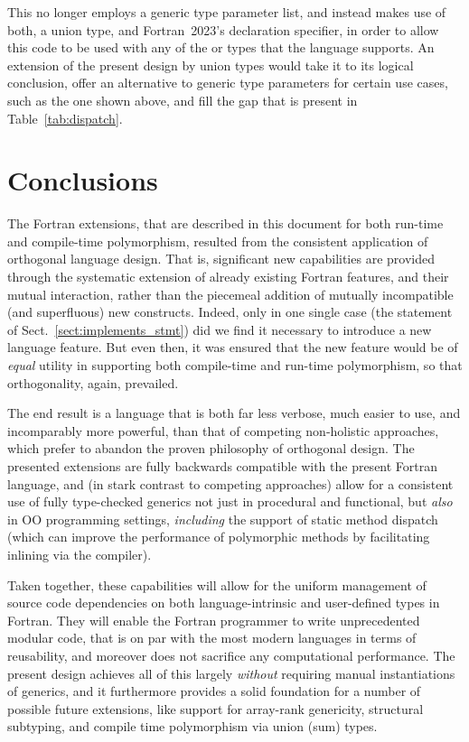 \documentclass[11pt,oneside]{report}
\newcommand{\code}[1]{{\selectfont\ttfamily{#1}}}
\begin{document}
This no longer employs a generic type parameter list, and instead
makes use of both, a union type, and Fortran~2023's \code{typeof}
declaration specifier, in order to allow this code to be used
with any of the \code{integer} or \code{real} types that the language
supports. An extension of the present design by union types would take
it to its logical conclusion, offer an alternative to generic type
parameters for certain use cases, such as the one shown above, and fill
the gap that is present in Table~\ref{tab:dispatch}.

\section{Conclusions}

The Fortran extensions, that are described in this document for both
run-time and compile-time polymorphism, resulted from the consistent
application of orthogonal language design. That is, significant new
capabilities are provided through the systematic extension of already
existing Fortran features, and their mutual interaction, rather than
the piecemeal addition of mutually incompatible (and superfluous) new
constructs. Indeed, only in one single case (the \code{implements}
statement of Sect.~\ref{sect:implements_stmt}) did we find it
necessary to introduce a new language feature. But even then, it was
ensured that the new feature would be of \emph{equal} utility in
supporting both compile-time and run-time polymorphism, so that
orthogonality, again, prevailed.

The end result is a language that is both far less verbose, much
easier to use, and incomparably more powerful, than that of competing
non-holistic approaches, which prefer to abandon the proven philosophy
of orthogonal design. The presented extensions are fully backwards
compatible with the present Fortran language, and (in stark contrast
to competing approaches) allow for a consistent use of fully
type-checked generics not just in procedural and functional, but
\emph{also} in OO programming settings, \emph{including} the support
of static method dispatch (which can improve the performance of
polymorphic methods by facilitating inlining via the compiler).

Taken together, these capabilities will allow for the uniform
management of source code dependencies on both language-intrinsic and
user-defined types in Fortran. They will enable the Fortran programmer
to write unprecedented modular code, that is on par with the most
modern languages in terms of reusability, and moreover does not
sacrifice any computational performance. The present design achieves
all of this largely \emph{without} requiring manual instantiations of
generics, and it furthermore provides a solid foundation for a number
of possible future extensions, like support for array-rank genericity,
structural subtyping, and compile time polymorphism via union (sum)
types.
\end{document}
